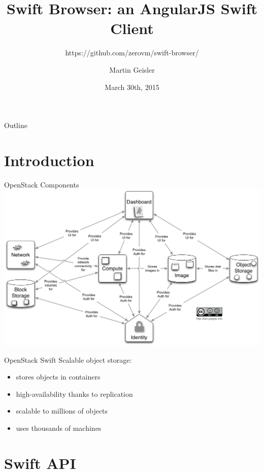 \documentclass[t,noamsthm]{beamer}
\title{Swift Browser: an AngularJS Swift Client}
\subtitle{https://github.com/zerovm/swift-browser/}
\author{Martin Geisler}
\institute{Rackspace International,\\Zurich Switzerland}
\date{March 30th, 2015}
\begin{document}
\begin{frame}
  \titlepage
\end{frame}

\begin{frame}{Outline}
  \tableofcontents
\end{frame}

\section{Introduction}

\begin{frame}[c]{OpenStack Components}
  \includegraphics[width=\textwidth]{openstack-components}
\end{frame}

\begin{frame}{OpenStack Swift}
  Scalable object storage:
  \begin{itemize}
  \item stores objects in containers
  \item high-availability thanks to replication
  \item scalable to millions of objects
  \item uses thousands of machines
  \end{itemize}
\end{frame}

\section{Swift API}

\newcommand{\contreq}[1]{\texttt{\makebox[3em][l]{#1} %
    /v1/<account>/<container>}}
\newcommand{\objreq}[1]{\texttt{\makebox[3em][l]{#1} %
    /v1/<account>/<container>/<object>}}
\end{document}
